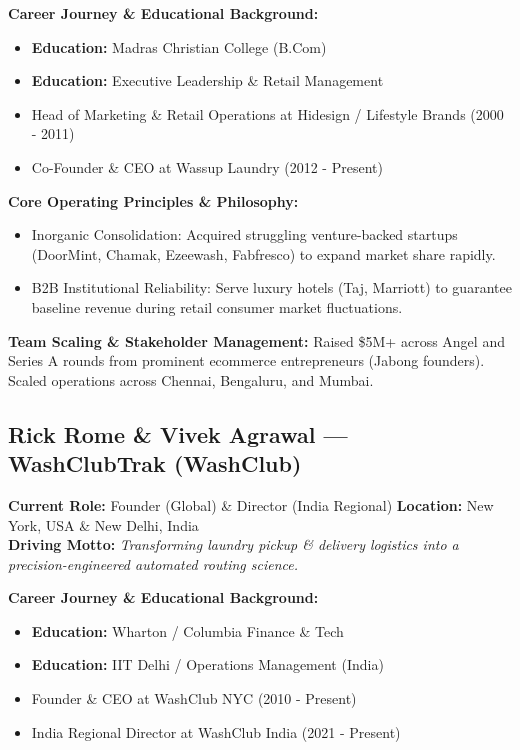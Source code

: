 \documentclass[11pt,a4paper]{article}
\begin{document}
\textbf{Career Journey \& Educational Background:}
\begin{itemize}[leftmargin=*]
    \item \textbf{Education:} Madras Christian College (B.Com)
    \item \textbf{Education:} Executive Leadership \& Retail Management
    \item Head of Marketing \& Retail Operations at Hidesign / Lifestyle Brands (2000 - 2011)
    \item Co-Founder \& CEO at Wassup Laundry (2012 - Present)
\end{itemize}

\textbf{Core Operating Principles \& Philosophy:}
\begin{itemize}[leftmargin=*]
    \item Inorganic Consolidation: Acquired struggling venture-backed startups (DoorMint, Chamak, Ezeewash, Fabfresco) to expand market share rapidly.
    \item B2B Institutional Reliability: Serve luxury hotels (Taj, Marriott) to guarantee baseline revenue during retail consumer market fluctuations.
\end{itemize}

\textbf{Team Scaling \& Stakeholder Management:} Raised \$5M+ across Angel and Series A rounds from prominent ecommerce entrepreneurs (Jabong founders). Scaled operations across Chennai, Bengaluru, and Mumbai.

\subsection{Rick Rome \& Vivek Agrawal --- WashClubTrak (WashClub)}
\textbf{Current Role:} Founder (Global) \& Director (India Regional) \quad \textbf{Location:} New York, USA \& New Delhi, India\\
\textbf{Driving Motto:} \textit{Transforming laundry pickup \& delivery logistics into a precision-engineered automated routing science.}

\textbf{Career Journey \& Educational Background:}
\begin{itemize}[leftmargin=*]
    \item \textbf{Education:} Wharton / Columbia Finance \& Tech
    \item \textbf{Education:} IIT Delhi / Operations Management (India)
    \item Founder \& CEO at WashClub NYC (2010 - Present)
    \item India Regional Director at WashClub India (2021 - Present)
\end{itemize}
\end{document}
